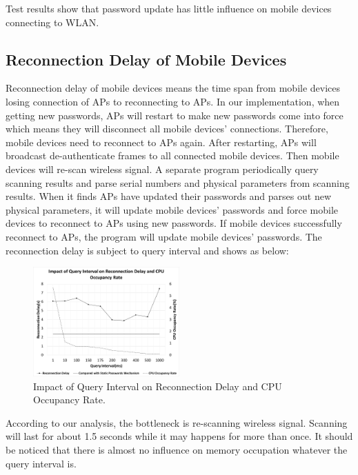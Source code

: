 Test results show that password update has little influence on mobile devices connecting to WLAN. 

\subsection{Reconnection Delay of Mobile Devices}
Reconnection delay of mobile devices means the time span from mobile devices losing connection of APs to reconnecting to APs. In our implementation, when getting new passwords, APs will restart to make new passwords come into force which means they will disconnect all mobile devices’ connections. Therefore, mobile devices need to reconnect to APs again. After restarting, APs will broadcast de-authenticate frames to all connected mobile devices. Then mobile devices will re-scan wireless signal. A separate program periodically query scanning results and parse serial numbers and physical parameters from scanning results. When it finds APs have updated their passwords and parses out new physical parameters, it will update mobile devices’ passwords and force mobile devices to reconnect to APs using new passwords. If mobile devices successfully reconnect to APs, the program will update mobile devices’ passwords. The reconnection delay is subject to query interval and shows as below: 

\begin{figure}
    \centering
    \includegraphics[width=0.5\textwidth]{pic/3.pdf}
    \caption{Impact of Query Interval on Reconnection Delay and CPU Occupancy Rate.}
    \label{fig:exp1}
\end{figure}




According to our analysis, the bottleneck is re-scanning wireless signal. Scanning will last for about 1.5 seconds while it may happens for more than once. It should be noticed that there is almost no influence on memory occupation whatever the query interval is.


